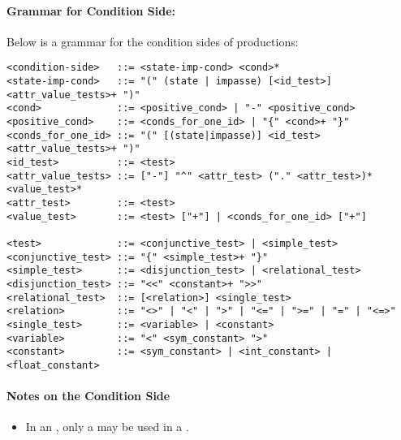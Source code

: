 \paragraph{Grammar for Condition Side:}
\label{SYNTAX-pm-condgrammar}

Below is a grammar for the condition sides of productions:

\begin{verbatim}
<condition-side>   ::= <state-imp-cond> <cond>*
<state-imp-cond>   ::= "(" (state | impasse) [<id_test>]
<attr_value_tests>+ ")"
<cond>             ::= <positive_cond> | "-" <positive_cond>
<positive_cond>    ::= <conds_for_one_id> | "{" <cond>+ "}"
<conds_for_one_id> ::= "(" [(state|impasse)] <id_test>
<attr_value_tests>+ ")"
<id_test>          ::= <test>
<attr_value_tests> ::= ["-"] "^" <attr_test> ("." <attr_test>)*
<value_test>*
<attr_test>        ::= <test>
<value_test>       ::= <test> ["+"] | <conds_for_one_id> ["+"]

<test>             ::= <conjunctive_test> | <simple_test>
<conjunctive_test> ::= "{" <simple_test>+ "}"
<simple_test>      ::= <disjunction_test> | <relational_test>
<disjunction_test> ::= "<<" <constant>+ ">>"
<relational_test>  ::= [<relation>] <single_test>
<relation>         ::= "<>" | "<" | ">" | "<=" | ">=" | "=" | "<=>"
<single_test>      ::= <variable> | <constant>
<variable>         ::= "<" <sym_constant> ">"
<constant>         ::= <sym_constant> | <int_constant> | <float_constant>
\end{verbatim}

\paragraph*{Notes on the Condition Side}

\vspace{-12pt}
\begin{itemize}
	\item In an , only a  may be used in a .
\end{itemize}



